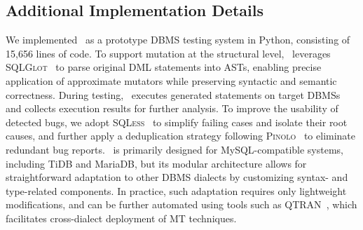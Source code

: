 \subsection{Additional Implementation Details}
\label{subsec:Implementation}

We implemented \toolname\ as a prototype DBMS testing system in Python, consisting of 15,656 lines of code.
To support mutation at the structural level, \toolname\ leverages \textsc{SQLGlot}~\cite{tobymao_sqlglot} to parse original DML statements into ASTs, enabling precise application of approximate mutators while preserving syntactic and semantic correctness.
During testing, \toolname\ executes generated statements on target DBMSs and collects execution results for further analysis.
To improve the usability of detected bugs, we adopt \textsc{SQLess}~\cite{lin2024sqless} to simplify failing cases and isolate their root causes, and further apply a deduplication strategy following \textsc{Pinolo}~\cite{hao2023pinolo} to eliminate redundant bug reports.
\toolname\ is primarily designed for MySQL-compatible systems, including TiDB and MariaDB, but its modular architecture allows for straightforward adaptation to other DBMS dialects by customizing syntax- and type-related components.
In practice, such adaptation requires only lightweight modifications, and can be further automated using tools such as \textsc{QTRAN}~\cite{lin2025qtran}, which facilitates cross-dialect deployment of MT techniques.
